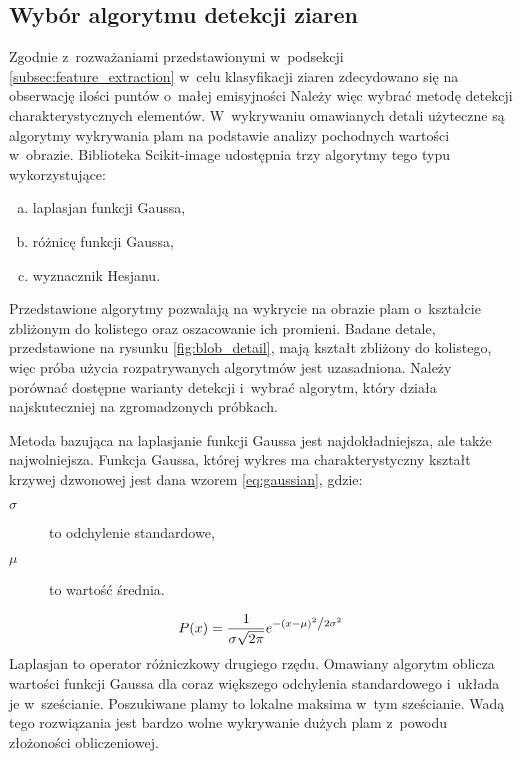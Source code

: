 \subsection{Wybór algorytmu detekcji ziaren}
\label{subsec:blob_detect}
Zgodnie z~rozważaniami przedstawionymi w~podsekcji
\ref{subsec:feature_extraction}
w~celu klasyfikacji ziaren zdecydowano się na obserwację ilości puntów
o~małej emisyjności
Należy więc wybrać metodę detekcji charakterystycznych elementów.
W~wykrywaniu omawianych detali użyteczne są algorytmy wykrywania plam na
podstawie analizy pochodnych wartości w~obrazie.
Biblioteka Scikit-image udostępnia trzy algorytmy tego typu wykorzystujące:
\begin{enumerate}[a)]
	\item laplasjan funkcji Gaussa,
	\item różnicę funkcji Gaussa,
	\item wyznacznik Hesjanu.
\end{enumerate}
Przedstawione algorytmy pozwalają na wykrycie na obrazie plam o~kształcie
zbliżonym do kolistego oraz oszacowanie ich promieni.
Badane detale, przedstawione na rysunku \ref{fig:blob_detail},
mają kształt zbliżony do kolistego, więc próba użycia rozpatrywanych
algorytmów jest uzasadniona.
Należy porównać dostępne warianty detekcji i~wybrać algorytm, który
działa najskuteczniej na zgromadzonych próbkach.

Metoda bazująca na laplasjanie funkcji Gaussa jest najdokładniejsza, ale
także najwolniejsza.
Funkcja Gaussa, której wykres ma charakterystyczny kształt krzywej dzwonowej
jest dana wzorem \ref{eq:gaussian}, gdzie:
\begin{description}
	\item[$ \sigma $] to odchylenie standardowe,
	\item[$ \mu $] to wartość średnia.
\end{description}
\begin{equation}
	P(x) = \frac{1}{{\sigma \sqrt {2\pi } }}
	e^{{{ - \left( {x - \mu } \right)^2 }
	\mathord{\left/ {\vphantom {{ - \left( {x - \mu } \right)^2 }
			{2\sigma ^2 }}} \right. \kern-\nulldelimiterspace} {2\sigma ^2 }}}
	\label{eq:gaussian}
\end{equation}
Laplasjan to operator różniczkowy drugiego rzędu.
Omawiany algorytm oblicza wartości funkcji Gaussa dla coraz większego
odchylenia standardowego i~układa je w~sześcianie.
Poszukiwane plamy to lokalne maksima w~tym sześcianie.
Wadą tego rozwiązania jest bardzo wolne wykrywanie dużych plam z~powodu
złożoności obliczeniowej.

